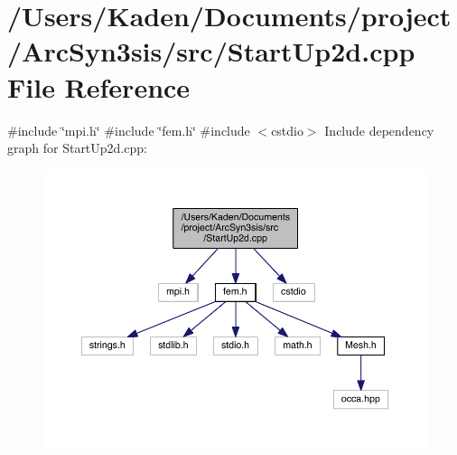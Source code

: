 \hypertarget{a00596}{}\section{/\+Users/\+Kaden/\+Documents/project/\+Arc\+Syn3sis/src/\+Start\+Up2d.cpp File Reference}
\label{a00596}
{\ttfamily \#include \char`\"{}mpi.\+h\char`\"{}}\newline
{\ttfamily \#include \char`\"{}fem.\+h\char`\"{}}\newline
{\ttfamily \#include $<$cstdio$>$}\newline
Include dependency graph for Start\+Up2d.\+cpp\+:\nopagebreak
\begin{figure}[H]
\begin{center}
\leavevmode
\includegraphics[width=350pt]{a00597}
\end{center}
\end{figure}
